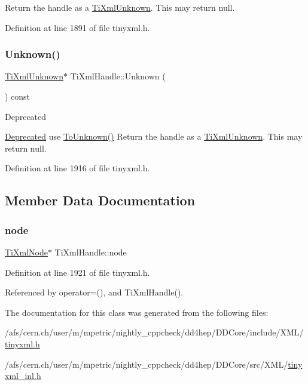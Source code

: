 Return the handle as a \hyperlink{class_ti_xml_unknown}{Ti\+Xml\+Unknown}. This may return null. 

Definition at line 1891 of file tinyxml.\+h.

\hypertarget{class_ti_xml_handle_a12b32f098c7daa5facbc04e9618262c5}{}\label{class_ti_xml_handle_a12b32f098c7daa5facbc04e9618262c5} 
\subsubsection{\texorpdfstring{Unknown()}{Unknown()}}
{\footnotesize\ttfamily \hyperlink{class_ti_xml_unknown}{Ti\+Xml\+Unknown}$\ast$ Ti\+Xml\+Handle\+::\+Unknown (\begin{DoxyParamCaption}{ }\end{DoxyParamCaption}) const\hspace{0.3cm}{\ttfamily [inline]}}

\begin{DoxyRefDesc}{Deprecated}
\item[\hyperlink{deprecated__deprecated000005}{Deprecated}]use \hyperlink{class_ti_xml_handle_a450ec91dac1ded02d72eb918d062ad31}{To\+Unknown()} Return the handle as a \hyperlink{class_ti_xml_unknown}{Ti\+Xml\+Unknown}. This may return null. \end{DoxyRefDesc}


Definition at line 1916 of file tinyxml.\+h.



\subsection{Member Data Documentation}
\hypertarget{class_ti_xml_handle_ac5429de14bb78b16288bac5bf33c6858}{}\label{class_ti_xml_handle_ac5429de14bb78b16288bac5bf33c6858} 
\subsubsection{\texorpdfstring{node}{node}}
{\footnotesize\ttfamily \hyperlink{class_ti_xml_node}{Ti\+Xml\+Node}$\ast$ Ti\+Xml\+Handle\+::node\hspace{0.3cm}{\ttfamily [private]}}



Definition at line 1921 of file tinyxml.\+h.



Referenced by operator=(), and Ti\+Xml\+Handle().



The documentation for this class was generated from the following files\+:\begin{DoxyCompactItemize}
\item 
/afs/cern.\+ch/user/m/mpetric/nightly\+\_\+cppcheck/dd4hep/\+D\+D\+Core/include/\+X\+M\+L/\hyperlink{tinyxml_8h}{tinyxml.\+h}\item 
/afs/cern.\+ch/user/m/mpetric/nightly\+\_\+cppcheck/dd4hep/\+D\+D\+Core/src/\+X\+M\+L/\hyperlink{tinyxml__inl_8h}{tinyxml\+\_\+inl.\+h}\end{DoxyCompactItemize}
